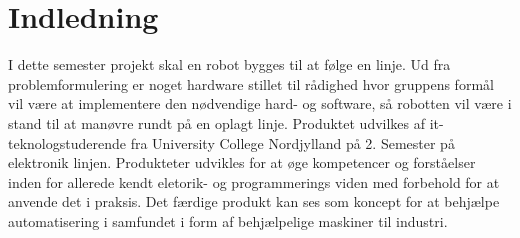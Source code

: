 \section{Indledning}
I dette semester projekt skal en robot bygges til at følge en linje. Ud fra problemformulering er noget hardware stillet til rådighed hvor gruppens formål vil være at implementere den nødvendige hard- og software, så 
robotten vil være i stand til at manøvre rundt på en oplagt linje. Produktet udvilkes af it-teknologstuderende fra University College Nordjylland på 2. Semester på elektronik linjen. 
Produkteter udvikles for at øge kompetencer og forståelser inden for allerede kendt eletorik- og programmerings viden med forbehold for at anvende det i praksis. Det færdige produkt kan ses som koncept for at behjælpe automatisering
i samfundet i form af behjælpelige maskiner til industri. 